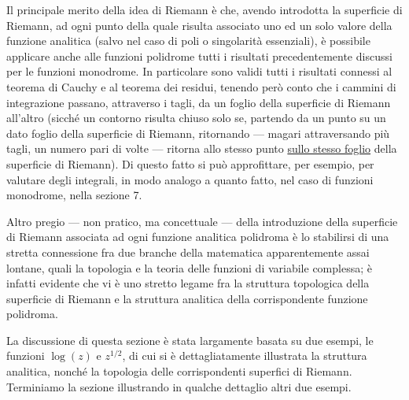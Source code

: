 \documentclass[11pt, a4paper]{book}
\numberwithin{equation}{section}
\begin{document}
Il principale merito della idea di Riemann è che, avendo introdotta la superficie di Riemann, ad ogni punto della quale risulta associato uno ed un solo valore della funzione analitica (salvo nel caso di poli o singolarità essenziali), è possibile applicare anche alle funzioni polidrome tutti i risultati precedentemente discussi per le funzioni monodrome. In particolare sono validi tutti i risultati connessi al teorema di Cauchy e al teorema dei residui, tenendo però conto che i cammini di integrazione passano, attraverso i tagli, da un foglio della superficie di Riemann all'altro (sicché un contorno risulta chiuso solo se, partendo da un punto su un dato foglio della superficie di Riemann, ritornando — magari attraversando più tagli, un numero pari di volte — ritorna allo stesso punto \underline{sullo stesso foglio} della superficie di Riemann). Di questo fatto si può approfittare, per esempio, per valutare degli integrali, in modo analogo a quanto fatto, nel caso di funzioni monodrome, nella sezione 7.

Altro pregio — non pratico, ma concettuale — della introduzione della superficie di Riemann associata ad ogni funzione analitica polidroma è lo stabilirsi di una stretta connessione fra due branche della matematica apparentemente assai lontane, quali la topologia e la teoria delle funzioni di variabile complessa; è infatti evidente che vi è uno stretto legame fra la%
struttura topologica della superficie di Riemann e la struttura analitica della corrispondente funzione polidroma.

La discussione di questa sezione è stata largamente basata su due esempi, le funzioni $\log(z)$ e $z^{1/2}$, di cui si è dettagliatamente illustrata la struttura analitica, nonché la topologia delle corrispondenti superfici di Riemann. Terminiamo la sezione illustrando in qualche dettaglio altri due esempi.
\end{document}
